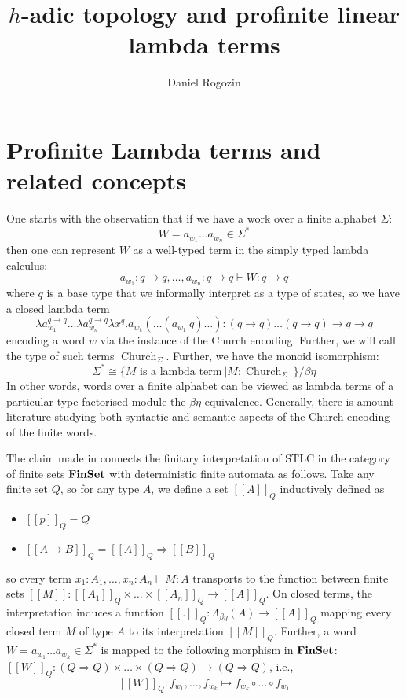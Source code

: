 \documentclass[8pt]{article}
\title{$h$-adic topology and profinite linear lambda terms}
\author{Daniel Rogozin}
\date{ }
\theoremstyle{definition}
\theoremstyle{definition}
\theoremstyle{definition}
\theoremstyle{definition}
\theoremstyle{definition}
\theoremstyle{definition}
\theoremstyle{definition}
\theoremstyle{definition}
\theoremstyle{definition}
\theoremstyle{definition}
\theoremstyle{definition}
\theoremstyle{definition}
\theoremstyle{definition}
\theoremstyle{definition}
\theoremstyle{question}
\begin{document}
\maketitle
\tableofcontents

\section{Profinite Lambda terms and related concepts}

One starts with the observation that if we have a work over a finite alphabet $\Sigma$:
\[
W = a_{w_1} \ldots a_{w_n} \in \Sigma^*
\]
then one can represent $W$ as a well-typed term in the simply typed lambda calculus:
\[
a_{w_1} : q \to q, \ldots, a_{w_n} : q \to q \vdash W : q \to q
\]
where $q$ is a base type that we informally interpret as a type of states, so we have a closed lambda
term
\[
\lambda a_{w_1}^{q \to q} \ldots \lambda a_{w_n}^{q \to q} \lambda x^q. a_{w_k} (\ldots (a_{w_1} \: q)\ldots) : (q \to q) \ldots (q \to q) \to q \to q
\]
encoding a word $w$ via the instance of the Church encoding. Further, we will call the type of such terms $\operatorname{Church}_{\Sigma}$.
Further, we have the monoid isomorphism:
\[
\Sigma^* \cong \{ \text{$M$ is a lambda term} \: | M : \operatorname{Church}_{\Sigma} \:\}/\beta \eta
\]
In other words, words over a finite alphabet can be viewed as lambda terms of a particular type factorised module the $\beta\eta$-equivalence.
Generally, there is amount literature studying both syntactic and semantic aspects of the Church encoding of the finite words.

The claim made in \cite{van2023profinite} connects the finitary interpretation of STLC in the category of finite sets ${\bf FinSet}$
with deterministic finite automata as follows. Take any finite set $Q$,
so for any type $A$, we define a set $[\![A]\!]_Q$ inductively defined as
\begin{itemize}
\item $[\![p]\!]_Q = Q$
\item $[\![A \to B]\!]_Q = [\![A]\!]_Q \Rightarrow [\![B]\!]_Q$
\end{itemize}
so every term $x_1 : A_1, \ldots, x_n : A_n \vdash M : A$ transports
to the function between finite sets $[\![M]\!] : [\![A_1]\!]_Q \times \ldots \times [\![A_n]\!]_Q \to [\![A]\!]_Q$.
On closed terms, the interpretation induces a function $[\![.]\!]_Q  : \Lambda_{\beta \eta}(A) \to [\![A]\!]_Q$
mapping every closed term $M$ of type $A$ to its interpretation $[\![M]\!]_Q$. 
Further, a word $W = a_{w_1} \ldots a_{w_k} \in \Sigma^*$ is mapped to the following morphism in ${\bf FinSet}$:
$[\![W]\!]_Q : (Q \Rightarrow Q) \times \ldots \times (Q \Rightarrow Q) \to (Q \Rightarrow Q)$, i.e.,
\[
[\![W]\!]_Q : f_{w_1}, \ldots, f_{w_k} \mapsto f_{w_k} \circ \ldots \circ f_{w_1}
\]
\end{document}
